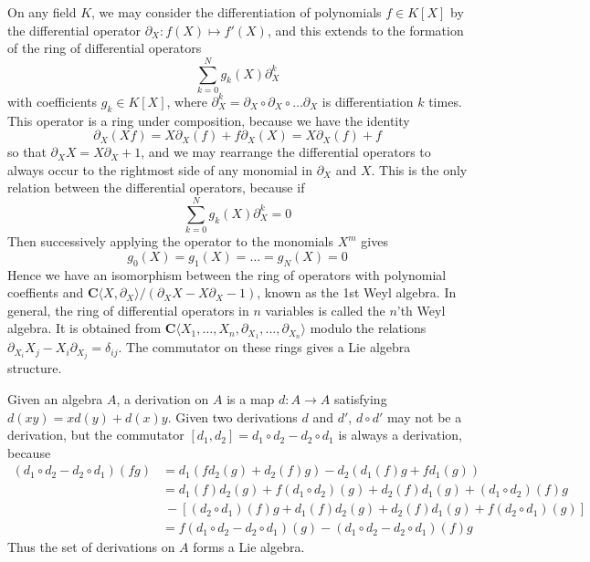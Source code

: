 \begin{example}
    On any field $K$, we may consider the differentiation of polynomials $f \in K[X]$ by the differential operator $\partial_X: f(X) \mapsto f'(X)$, and this extends to the formation of the ring of differential operators
    \[ \sum_{k = 0}^N g_k(X) \partial_X^k \]
    with coefficients $g_k \in K[X]$, where $\partial_X^k = \partial_X \circ \partial_X \circ \dots \partial_X$ is differentiation $k$ times. This operator is a ring under composition, because we have the identity
    \[ \partial_X(Xf) = X \partial_X(f) + f \partial_X(X) = X \partial_X(f) + f \]
    so that $\partial_X X = X \partial_X + 1$, and we may rearrange the differential operators to always occur to the rightmost side of any monomial in $\partial_X$ and $X$. This is the only relation between the differential operators, because if
    \[ \sum_{k = 0}^N g_k(X) \partial_X^k = 0 \]
    Then successively applying the operator to the monomials $X^m$ gives
    \[ g_0(X) = g_1(X) = \dots = g_N(X) = 0 \]
    Hence we have an isomorphism between the ring of operators with polynomial coeffients and $\mathbf{C}\langle X, \partial_X \rangle / (\partial_X X - X \partial_X - 1)$, known as the 1st Weyl algebra. In general, the ring of differential operators in $n$ variables is called the $n$'th Weyl algebra. It is obtained from $\mathbf{C}\langle X_1, \dots, X_n, \partial_{X_1}, \dots, \partial_{X_n} \rangle$ modulo the relations $\partial_{X_i} X_j - X_i \partial_{X_j} = \delta_{ij}$. The commutator on these rings gives a Lie algebra structure.
\end{example}

\begin{example}
    Given an algebra $A$, a derivation on $A$ is a map $d: A \to A$ satisfying $d(xy) = xd(y) + d(x)y$. Given two derivations $d$ and $d'$, $d \circ d'$ may not be a derivation, but the commutator $[d_1, d_2] = d_1 \circ d_2 - d_2 \circ d_1$ is always a derivation, because
    \begin{align*}
        (d_1 \circ d_2 - d_2 \circ d_1)(fg) &= d_1(f d_2(g) + d_2(f) g) - d_2(d_1(f) g + f d_1(g))\\
        &= d_1(f) d_2(g) + f (d_1 \circ d_2)(g) + d_2(f) d_1(g) + (d_1 \circ d_2)(f) g\\
        &\ - [(d_2 \circ d_1)(f) g + d_1(f) d_2(g) + d_2(f) d_1(g) + f (d_2 \circ d_1)(g)]\\
        &= f(d_1 \circ d_2 - d_2 \circ d_1)(g) - (d_1 \circ d_2 - d_2 \circ d_1)(f) g
    \end{align*}
    Thus the set of derivations on $A$ forms a Lie algebra.
\end{example}

